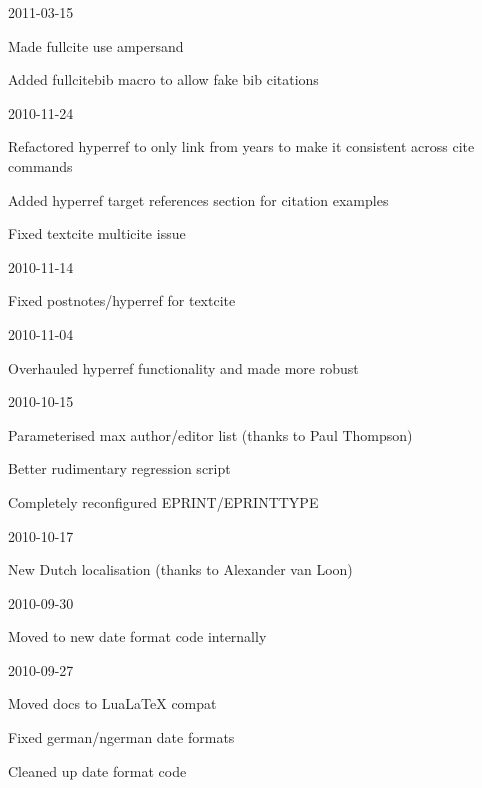 \documentclass{ltxdockit}
\begin{document}
\begin{changelog}
\begin{release}{2.6}{2011-03-15}
\item Made fullcite use ampersand
\item Added fullcitebib macro to allow fake bib citations
\end{release}

\begin{release}{2.5}{2010-11-24}
\item Refactored hyperref to only link from years to make it
  consistent across cite commands
\item Added hyperref target references section for citation examples
\item Fixed textcite multicite issue
\end{release}

\begin{release}{2.4}{2010-11-14}
\item Fixed postnotes/hyperref for textcite
\end{release}

\begin{release}{2.3}{2010-11-04}
\item Overhauled hyperref functionality and made more robust
\end{release}

\begin{release}{2.2}{2010-10-15}
\item Parameterised max author/editor list (thanks to Paul Thompson)
\item Better rudimentary regression script
\item Completely reconfigured EPRINT/EPRINTTYPE
\end{release}

\begin{release}{2.1}{2010-10-17}
\item New Dutch localisation (thanks to Alexander van Loon)
\end{release}

\begin{release}{2.0}{2010-09-30}
\item Moved to new date format code internally
\end{release}

\begin{release}{1.9}{2010-09-27}
\item Moved docs to LuaLaTeX compat
\item Fixed german/ngerman date formats
\item Cleaned up date format code
\end{release}


\end{changelog}
\end{document}
